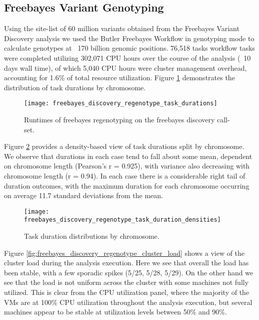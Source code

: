 \subsection{Freebayes Variant Genotyping}

Using the site-list of 60 million variants obtained from the Freebayes Variant Discovery analysis we used the Butler Freebayes Workflow in genotyping mode to calculate genotypes at ~170 billion genomic positions. 76,518 tasks workflow tasks were completed utilizing 302,071 CPU hours over the course of the analysis (~10 days wall time), of which 5,040 CPU hours were cluster management overhead, accounting for 1.6\% of total resource utilization. Figure  \ref{fig:freebayes_discovery_regenotype_task_durations} demonstrates the distribution of task durations by chromosome.

\begin{figure}[H]
\texttt{[image: freebayes\_discovery\_regenotype\_task\_durations]}
\centering
\caption {Runtimes of freebayes regenotyping on the freebayes discovery call-set.}
\label{fig:freebayes_discovery_regenotype_task_durations}
\end{figure}

Figure \ref{fig:freebayes_discovery_regenotype_task_duration_densities} provides a density-based view of task durations split by chromosome. We observe that durations in each case tend to fall about some mean, dependent on chromosome length (Pearson's r = 0.925), with variance also decreasing with chromosome length (r = 0.94). In each case there is a considerable right tail of duration outcomes, with the maximum duration for each chromosome occurring on average 11.7 standard deviations from the mean.

\begin{figure}[H]
\texttt{[image: freebayes\_discovery\_regenotype\_task\_duration\_densities]}
\centering
\caption {Task duration distributions by chromosome.}
\label{fig:freebayes_discovery_regenotype_task_duration_densities}
\end{figure}

Figure \ref{fig:freebayes_discovery_regenotype_cluster_load} shows a view of the cluster load during the analysis execution. Here we see that overall the load has been stable, with a few sporadic spikes (5/25, 5/28, 5/29). On the other hand we see that the load is not uniform across the cluster with some machines not fully utilized. This is clear from the CPU utilization panel, where the majority of the VMs are at 100\% CPU utilization throughout the analysis execution, but several machines appear to be stable at utilization levels between 50\% and 90\%.

